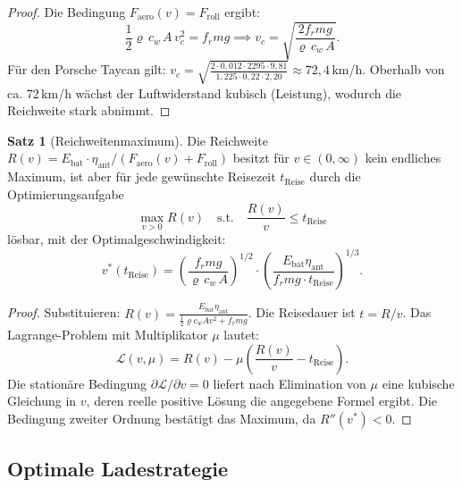 ﻿\documentclass[a4paper,12pt]{article}
\theoremstyle{definition}
\newtheorem{satz}{Satz}
\begin{document}
\begin{proof}
  Die Bedingung $F_{\mathrm{aero}}(v) = F_{\mathrm{roll}}$ ergibt:
  \[
    \frac{1}{2}\varrho\, c_w\, A\, v_c^2 = f_r m g
    \implies v_c = \sqrt{\frac{2 f_r m g}{\varrho\, c_w\, A}}.
  \]
  F\"ur den Porsche Taycan gilt:
  $v_c = \sqrt{\frac{2 \cdot 0{,}012 \cdot 2295 \cdot 9{,}81}{1{,}225 \cdot 0{,}22 \cdot 2{,}20}}
  \approx 72{,}4$\,km/h.
  Oberhalb von ca. 72\,km/h w\"achst der Luftwiderstand kubisch (Leistung),
  wodurch die Reichweite stark abnimmt.
\end{proof}

\begin{satz}[Reichweitenmaximum]
\label{satz:range}
  Die Reichweite $R(v) = E_{\mathrm{bat}} \cdot \eta_{\mathrm{ant}} / (F_{\mathrm{aero}}(v) + F_{\mathrm{roll}})$
  besitzt f\"ur $v \in (0, \infty)$ kein endliches Maximum, ist aber
  f\"ur jede gew\"unschte Reisezeit $t_{\mathrm{Reise}}$ durch die
  Optimierungsaufgabe
  \[
    \max_{v > 0} R(v) \quad \text{s.t.} \quad \frac{R(v)}{v} \leq t_{\mathrm{Reise}}
  \]
  l\"osbar, mit der Optimalgeschwindigkeit:
  \[
    v^*(t_{\mathrm{Reise}}) = \left(\frac{f_r m g}{\varrho\, c_w\, A}\right)^{1/2}
      \cdot \left(\frac{E_{\mathrm{bat}} \eta_{\mathrm{ant}}}{f_r m g \cdot t_{\mathrm{Reise}}}\right)^{1/3}.
  \]
\end{satz}

\begin{proof}
  Substituieren: $R(v) = \frac{E_{\mathrm{bat}} \eta_{\mathrm{ant}}}{\frac{1}{2}\varrho c_w A v^2 + f_r m g}$.
  Die Reisedauer ist $t = R/v$.
  Das Lagrange-Problem mit Multiplikator $\mu$ lautet:
  \[
    \mathcal{L}(v, \mu) = R(v) - \mu \left(\frac{R(v)}{v} - t_{\mathrm{Reise}}\right).
  \]
  Die station\"are Bedingung $\partial \mathcal{L}/\partial v = 0$ liefert
  nach Elimination von $\mu$ eine kubische Gleichung in $v$, deren reelle
  positive L\"osung die angegebene Formel ergibt. Die Bedingung zweiter Ordnung
  best\"atigt das Maximum, da $R''(v^*) < 0$.
\end{proof}

\subsection{Optimale Ladestrategie}
\end{document}
